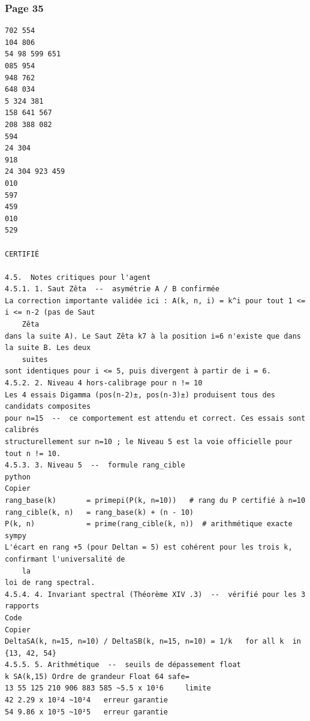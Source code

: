 \documentclass[11pt,a4paper]{article}
\begin{document}
\subsubsection*{Page 35}
\begin{Verbatim}[fontsize=\footnotesize]
702 554 
104 806 
54 98 599 651 
085 954 
948 762 
648 034 
5 324 381 
158 641 567 
208 388 082 
594 
24 304 
918 
24 304 923 459 
010 
597 
459 
010 
529 
   
CERTIFIÉ 
 
4.5.  Notes critiques pour l'agent 
4.5.1. 1. Saut Zêta  --  asymétrie A / B confirmée 
La correction importante validée ici : A(k, n, i) = k^i pour tout 1 <= i <= n-2 (pas de Saut
    Zêta
dans la suite A). Le Saut Zêta k7 à la position i=6 n'existe que dans la suite B. Les deux
    suites
sont identiques pour i <= 5, puis divergent à partir de i = 6. 
4.5.2. 2. Niveau 4 hors-calibrage pour n != 10 
Les 4 essais Digamma (pos(n-2)±, pos(n-3)±) produisent tous des candidats composites 
pour n=15  --  ce comportement est attendu et correct. Ces essais sont calibrés 
structurellement sur n=10 ; le Niveau 5 est la voie officielle pour tout n != 10. 
4.5.3. 3. Niveau 5  --  formule rang_cible 
python 
Copier 
rang_base(k)       = primepi(P(k, n=10))   # rang du P certifié à n=10 
rang_cible(k, n)   = rang_base(k) + (n - 10) 
P(k, n)            = prime(rang_cible(k, n))  # arithmétique exacte sympy 
L'écart en rang +5 (pour Deltan = 5) est cohérent pour les trois k, confirmant l'universalité de
    la
loi de rang spectral. 
4.5.4. 4. Invariant spectral (Théorème XIV .3)  --  vérifié pour les 3 rapports 
Code 
Copier 
DeltaSA(k, n=15, n=10) / DeltaSB(k, n=15, n=10) = 1/k   for all k  in  {13, 42, 54}   
4.5.5. 5. Arithmétique  --  seuils de dépassement float 
k SA(k,15) Ordre de grandeur Float 64 safe= 
13 55 125 210 906 883 585 ~5.5 x 10¹6     limite 
42 2.29 x 10²4 ~10²4   erreur garantie 
54 9.86 x 10²5 ~10²5   erreur garantie 
\end{Verbatim}
\medskip
\clearpage
\end{document}

